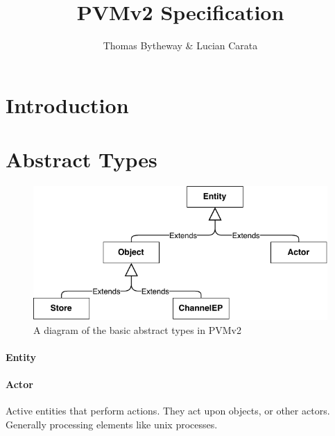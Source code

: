 \documentclass[12pt,twoside,openright,a4paper]{article}
\begin{document}
\title{PVMv2 Specification}
\author{Thomas Bytheway & Lucian Carata}

\begin{minipage}[h]{\textwidth}
    \maketitle
    \vspace{2in}
    {\small}
\end{minipage}

\normalsize



\clearpage

\section{Introduction}

\section{Abstract Types}

\begin{figure}[h]
\centering
\includegraphics{pvm_types.pdf}
\caption{A diagram of the basic abstract types in PVMv2}
\end{figure}

\paragraph{Entity}

\paragraph{Actor}
Active entities that perform actions. They act upon objects, or other actors. Generally processing elements like unix processes.
\end{document}
